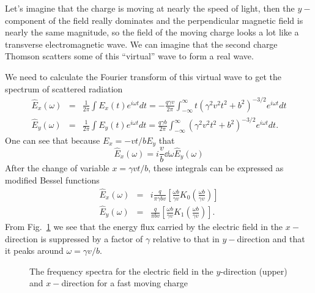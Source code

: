 Let's imagine that the charge is moving at nearly the speed of light,
then the $y-$component of the field really dominates and the
perpendicular magnetic field is nearly the same magnitude, so the
field of the moving charge looks a lot like a transverse
electromagnetic wave.   We can imagine that the second charge Thomson
scatters some of this ``virtual'' wave to form a real wave.

We need to calculate the Fourier transform of this virtual wave to get
the spectrum of scattered radiation
\begin{eqnarray}
{\hat E}_x(\omega) &=& \frac{1}{2\pi} \int E_x(t) e^{i\omega t}dt = -\frac{q
  \gamma v}{2\pi} \int_{-\infty}^\infty  t \left ( \gamma^2 v^2 t^2 + b^2
\right )^{-3/2} e^{i\omega t} dt \\
{\hat E}_y(\omega) &=& \frac{1}{2\pi} \int E_y(t) e^{i\omega t}dt = \frac{q
  \gamma b}{2\pi} \int_{-\infty}^\infty \left ( \gamma^2 v^2 t^2 + b^2
\right )^{-3/2} e^{i\omega t} dt.
\label{eq:358}
\end{eqnarray}
One can see that because $E_x = -vt/b E_y$ that 
\begin{equation}
{\hat E}_x(\omega) = i \frac{v}{b} \dd{}{\omega} {\hat E}_y(\omega)
\label{eq:821}
\end{equation}
After the change of variable $x=\gamma v t /b$, these integrals can be 
expressed as modified Bessel functions
\begin{eqnarray}
{\hat E}_x(\omega) &=&  i \frac{q}{\pi \gamma b v} \left [ \frac{\omega
      b}{\gamma v} K_0 \left ( \frac{\omega b}{\gamma v} \right
    )\right ]
\label{eq:822}
\\
{\hat E}_y(\omega) &=&  \frac{q}{\pi b v} \left [ \frac{\omega
      b}{\gamma v} K_1 \left ( \frac{\omega b}{\gamma v} \right )
  \right ].
\label{eq:823}
\end{eqnarray}
From Fig.~\ref{fig:bremspec} we see that the energy flux carried by
the electric field in the $x-$direction is suppressed by a factor of
$\gamma$ relative to that in $y-$direction and that it peaks around
$\omega=\gamma v/b$.  
\begin{figure}
\begin{center}
\end{center}
\caption{The frequency spectra for the electric field in the
  $y$-direction (upper) and $x-$direction for a fast moving charge}
\label{fig:bremspec}
\end{figure}

